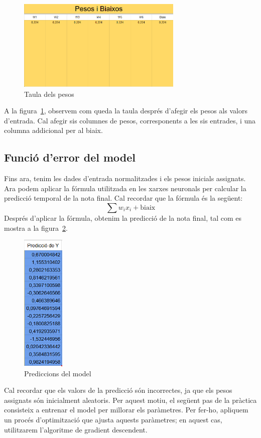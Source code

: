 \begin{figure}[H]
    \centering
    \includegraphics[width=0.7\textwidth]{./figures/Pesos.png}
    \caption{Taula dels pesos}
    \label{f:pesos}
\end{figure}

A la figura~\ref{f:pesos}, observem com queda la taula després d’afegir els pesos als valors d’entrada. Cal afegir sis columnes de pesos, corresponents a les sis entrades, i una columna addicional per al biaix.

\subsection{Funció d'error del model}
Fins ara, tenim les dades d’entrada normalitzades i els pesos inicials assignats. Ara podem aplicar la fórmula utilitzada en les xarxes neuronals per calcular la predicció temporal de la nota final. Cal recordar que la fórmula és la següent:
$$\sum w_i x_i + \text{biaix}$$
Després d’aplicar la fórmula, obtenim la predicció de la nota final, tal com es mostra a la figura~\ref{f:Predicciones}.
\begin{figure}[h!]
    \centering
    \includegraphics[width=0.18\textwidth]{./figures/Predicciones.png}
    \caption{Prediccions del model}
    \label{f:Predicciones}
 \end{figure}
Cal recordar que els valors de la predicció són incorrectes, ja que els pesos assignats són inicialment aleatoris. Per aquest motiu, el següent pas de la pràctica consisteix a entrenar el model per millorar els paràmetres. Per fer-ho, apliquem un procés d’optimització que ajusta aquests paràmetres; en aquest cas, utilitzarem l’algoritme de gradient descendent.\\

